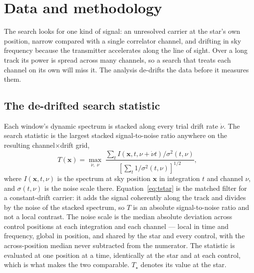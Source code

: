 \section{Data and methodology}
\label{sec:method}

The search looks for one kind of signal: an unresolved carrier at the
star's own position, narrow compared with a single correlator channel, and
drifting in sky frequency because the transmitter accelerates along the line
of sight. Over a long track its power is spread across many channels, so a
search that treats each channel on its own will miss it. The analysis
de-drifts the data before it measures them.

\subsection{The de-drifted search statistic}
\label{sec:statistic}

Each window's dynamic spectrum is stacked along every trial drift rate
$\dot\nu$. The search statistic is the largest stacked signal-to-noise
ratio anywhere on the resulting channel$\times$drift grid,
%
\begin{equation}
T(\mathbf{x})=\max_{\dot\nu,\;\nu}\;
\frac{\sum_{t} I\!\left(\mathbf{x},t,\nu+\dot\nu t\right)\big/\sigma^{2}(t,\nu)}
     {\left[\sum_{t}1\big/\sigma^{2}(t,\nu)\right]^{1/2}},
\label{eq:tstar}
\end{equation}
%
where $I(\mathbf{x},t,\nu)$ is the spectrum at sky position $\mathbf{x}$
in integration $t$ and channel $\nu$, and $\sigma(t,\nu)$ is the noise scale
there. Equation~\ref{eq:tstar} is the matched filter for a constant-drift
carrier: it adds the signal coherently along the track and divides by the
noise of the stacked spectrum, so $T$ is an absolute signal-to-noise ratio
and not a local contrast. The noise scale is the median absolute deviation
across \NCtrl{} control positions at each integration and each channel ---
local in time and frequency, global in position, and shared by the star and
every control, with the across-position median never subtracted from the
numerator. The statistic is evaluated at one position at a time, identically
at the star and at each control, which is what makes the two comparable.
$T_\star$ denotes its value at the star.

